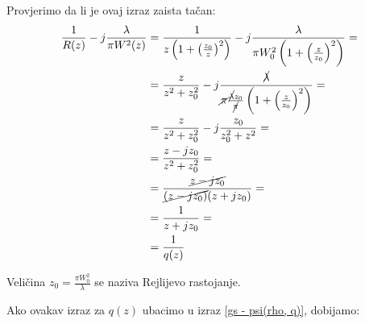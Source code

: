 \documentclass[fleqn]{report}
\begin{document}
\begin{tbox}
    Provjerimo da li je ovaj izraz zaista tačan:
    \begin{align*}
        \frac{1}{R(z)} - j\frac{\lambda}{\pi W^2(z)} & = \frac{1}{z\left(1 + \left(\frac{z_0}{z}\right)^2\right)} - j\frac{\lambda}{\pi W_0^2\left(1 + \left(\frac{z}{z_0}\right)^2\right)} =                    \\
                                                     & = \frac{z}{z^2 + z_0^2} - j\frac{\cancel{\lambda}}{\cancel{\pi} \frac{\cancel{\lambda} z_0}{\cancel{\pi}}\left(1 + \left(\frac{z}{z_0}\right)^2\right)} = \\
                                                     & = \frac{z}{z^2 + z_0^2} - j\frac{z_0}{z_0^2 + z^2} =                                                                                                      \\
                                                     & = \frac{z - jz_0}{z^2 + z_0^2} =                                                                                                                          \\
                                                     & = \frac{\cancel{z - jz_0}}{\cancel{(z - jz_0)}(z + jz_0)} =                                                                                               \\
                                                     & = \frac{1}{z + jz_0} =                                                                                                                                    \\
                                                     & = \frac{1}{q(z)}
    \end{align*}
\end{tbox}
\begin{tbox}
    Veličina $z_0 = \frac{\pi W_0^2}{\lambda}$ se naziva Rejlijevo rastojanje.
\end{tbox}
Ako ovakav izraz za $q(z)$ ubacimo u izraz \eqref{gs - psi(rho, q)}, dobijamo:
\end{document}
